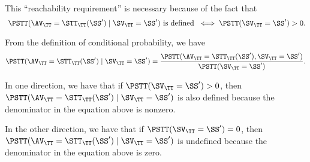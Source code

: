 \begin{note}
  This ``reachability requirement'' is necessary
  because of the fact that
  $$\text{ 
  $
  \PSTT(\AV_\TT = \STT_\TT(\SS') \mid \SV_\TT = \SS')$
  is defined } 
  \iff 
  \PSTT(\SV_{\TT} = \SS') > 0
  .$$%

  From the definition of conditional probability, we have
  $$ 
  \PSTT(\AV_\TT = \STT_\TT(\SS') \mid \SV_\TT = \SS')
  = 
  \frac
  {\PSTT(\AV_\TT = \STT_\TT(\SS'), \SV_\TT = \SS')}
  {\PSTT(\SV_\TT = \SS')}.$$

  In one direction, we have that if $\PSTT(\SV_\TT = \SS') > 0$, then 
  $ \PSTT(\AV_\TT = \STT_\TT(\SS') \mid \SV_\TT = \SS') $
  is also defined because the denominator in the equation above is nonzero.

  In the other direction, we have that if $\PSTT(\SV_\TT = \SS') = 0$, then 
  $ \PSTT(\AV_\TT = \STT_\TT(\SS') \mid \SV_\TT = \SS') $
  is undefined because the denominator in the equation above is zero.
\end{note}
